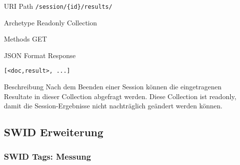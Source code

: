 \documentclass[10pt,a4paper]{scrartcl}
\begin{document}
\begin{mdframed}[style=def]
\begin{description*}
	\item[URI Path] \texttt{/session/\{id\}/results/}
	\item[Archetype] Readonly Collection
	\item[Methods] GET
	\item[JSON Format Response] \hfill
\begin{lstlisting}
[<doc,result>, ...]
\end{lstlisting}
	\item[Beschreibung] Nach dem Beenden einer Session können die eingetragenen
	Resultate in dieser Collection abgefragt werden. Diese Collection ist readonly,
	damit die Session-Ergebnisse nicht nachträglich geändert werden können.
\end{description*}
\end{mdframed}


\pagebreak


\subsection{SWID Erweiterung}

\subsubsection{SWID Tags: Messung}
\end{document}
